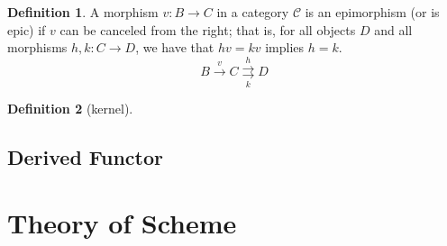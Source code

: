 \documentclass[a4paper,12pt]{article}
\theoremstyle{definition}
\newtheorem{defn}{Definition}[subsection]
\begin{document}
\begin{defn}
    A morphism $v: B \rightarrow C$ in a category $\mathcal{C}$ is an epimorphism (or is epic) if $v$ can be canceled from the right; that is, for all objects $D$ and all morphisms $h, k: C \rightarrow D$, we have that $h v=k v$ implies $h=k$.
    $$
        B \xrightarrow{v} C \underset{k}{\stackrel{h}{\rightrightarrows}} D
    $$
\end{defn}
\begin{defn}[kernel]
\end{defn}




\newpage
\subsection{Derived Functor}


\newpage
\section{Theory of Scheme}
\end{document}
